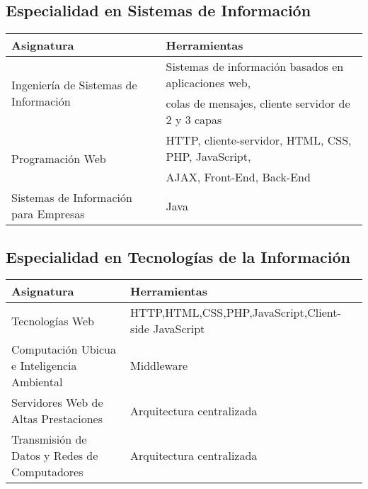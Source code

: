 \subsection{Especialidad en Sistemas de Información}

\begin{center}
	\begin{tabular}{l|l}
		\textbf{Asignatura}                                    & \textbf{Herramientas} \\ \hline
		\multirow{2}{*}{Ingeniería de Sistemas de Información} & Sistemas de información basados en aplicaciones web, \\
		                                                       & colas de mensajes, cliente servidor de 2 y 3 capas \\
		\multirow{2}{*}{Programación Web}                      & HTTP, cliente-servidor, HTML, CSS, PHP, JavaScript, \\
		                                                       & AJAX, Front-End, Back-End                           \\
		Sistemas de Información para Empresas                  & Java
	\end{tabular}
\end{center}

\subsection{Especialidad en Tecnologías de la Información}

\begin{center}
	\begin{tabular}{l|l}
		\textbf{Asignatura}                          & \textbf{Herramientas} \\ \hline
		Tecnologías Web                              & HTTP,HTML,CSS,PHP,JavaScript,Client-side JavaScript \\
		Computación Ubicua e Inteligencia Ambiental  & Middleware \\
		Servidores Web de Altas Prestaciones         & Arquitectura centralizada \\
		Transmisión de Datos y Redes de Computadores & Arquitectura centralizada
	\end{tabular}
\end{center}
